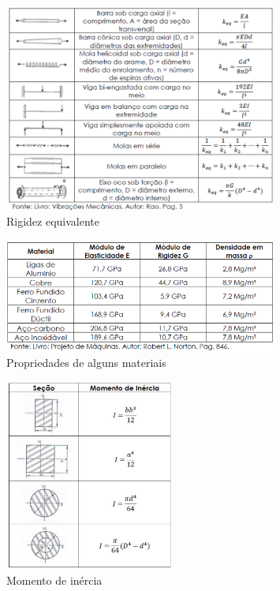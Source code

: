 \documentclass[a4paper,12pt]{article}
\author{Victor Locatelli}
\title{}
\date{}
\begin{document}
%

\begin{figure}[ht]
    \centering
    \includegraphics[width=0.8\textwidth]{imagens/rigidez_equivalente.png}
    \caption{Rigidez equivalente}
    \label{fig:rigidez_equivalente}
\end{figure}
\begin{figure}[ht]
    \centering
    \includegraphics[width=0.8\textwidth]{imagens/propriedades_materiais.png}
    \caption{Propriedades de alguns materiais}
    \label{fig:propriedades_materiais}
\end{figure}

\begin{figure}[ht]
    \centering
    \includegraphics[width=0.5\textwidth]{imagens/momento_de_inercia.png}
    \caption{Momento de inércia}
    \label{fig:imagens-momento_de_inercia-png}
\end{figure}
\end{document}
